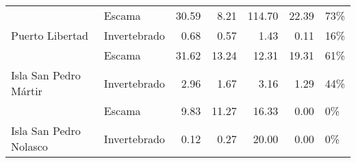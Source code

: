 \begin{table}
\begin{tabular}[t]{llrrrrl}
 & Escama & 30.59 & 8.21 & 114.70 & 22.39 & 73\%\\
\cmidrule{2-7}
\multirow{-2}{*}{\raggedright\arraybackslash Puerto Libertad} & Invertebrado & 0.68 & 0.57 & 1.43 & 0.11 & 16\%\\
\cmidrule{1-7}
 & Escama & 31.62 & 13.24 & 12.31 & 19.31 & 61\%\\
\cmidrule{2-7}
\multirow{-2}{*}{\raggedright\arraybackslash Isla San Pedro Mártir} & Invertebrado & 2.96 & 1.67 & 3.16 & 1.29 & 44\%\\
\cmidrule{1-7}
 & Escama & 9.83 & 11.27 & 16.33 & 0.00 & 0\%\\
\cmidrule{2-7}
\multirow{-2}{*}{\raggedright\arraybackslash Isla San Pedro Nolasco} & Invertebrado & 0.12 & 0.27 & 20.00 & 0.00 & 0\%\\
\bottomrule
\end{tabular}
\end{table}